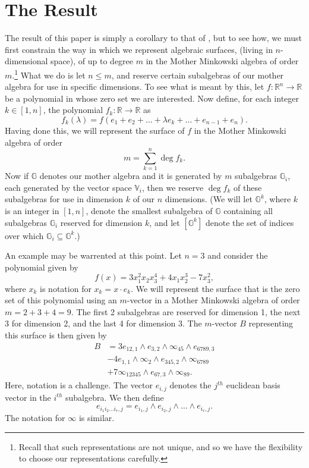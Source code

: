 \documentclass{birkjour}
\theoremstyle{definition}
\theoremstyle{remark}
\numberwithin{equation}{section}
\newcommand{\R}{\mathbb{R}}
\newcommand{\G}{\mathbb{G}}
\newcommand{\V}{\mathbb{V}}
\newcommand{\nvai}{\infty}
\begin{document}
\section{The Result}

The result of this paper is simply a corollary to that of \cite{Parkin13}, but to see how,
we must first constrain the way in which we represent algebraic surfaces, (living in $n$-dimensional space), of up to degree $m$
in the Mother Minkowski algebra of order $m$.\footnote{Recall that such representations are not unique, and so
we have the flexibility to choose our representations carefully.} What we do is let $n\leq m$, and
reserve certain subalgebras of our mother algebra for use in specific dimensions.
To see what is meant by this, let $f:\R^n\to\R$ be a polynomial in whose zero set
we are interested.  Now define, for each integer $k\in[1,n]$, the polynomial $f_k:\R\to\R$ as
\begin{equation*}
f_k(\lambda)=f(e_1+e_2+\dots+\lambda e_k+\dots +e_{n-1}+e_n).
\end{equation*}
Having done this, we will represent the
surface of $f$ in the Mother Minkowski algebra of order
\begin{equation*}
m=\sum_{k=1}^n\deg f_k.
\end{equation*}
Now if $\G$ denotes our mother algebra and it is generated by $m$ subalgebras $\G_i$,
each generated by the vector space $\V_i$, then we reserve $\deg f_k$
of these subalgebras for use in dimension $k$ of our $n$ dimensions.
(We will let $\G^k$, where $k$ is an integer in $[1,n]$, denote the smallest
subalgebra of $\G$ containing all subalgebras $\G_i$ reserved for dimension $k$,
and let $[\G^k]$ denote the set of indices over which $\G_i\subseteq\G^k$.)

An example may be warrented at this point.  Let $n=3$ and consider the
polynomial given by
\begin{equation}\label{equ_example_poly}
f(x) = 3x_1^2x_2x_3^4 + 4x_1x_2^3 - 7x_3^2,
\end{equation}
where $x_k$ is notation for $x_k=x\cdot e_k$.  We will represent the
surface that is the zero set of this polynomial using an $m$-vector
in a Mother Minkowski algebra of order $m=2+3+4=9$.  The first
2 subalgebras are reserved for dimension 1, the next 3 for dimension
2, and the last 4 for dimension 3.  The $m$-vector $B$
representing this surface is then given by
\begin{align}
B &= 3e_{12,1}\wedge e_{3,2}\wedge \nvai_{45} \wedge e_{6789,3}\nonumber \\
 &- 4e_{1,1}\wedge\nvai_2\wedge e_{345,2}\wedge\nvai_{6789}\nonumber \\
 &+7\nvai_{12345}\wedge e_{67,3}\wedge\nvai_{89}.\label{equ_B_example}
\end{align}
Here, notation is a challenge.  The vector $e_{i,j}$ denotes the $j^{th}$ euclidean basis vector
in the $i^{th}$ subalgebra.  We then define
\begin{equation*}
e_{i_1i_2\dots i_r,j} = e_{i_1,j}\wedge e_{i_2,j}\wedge\dots\wedge e_{i_r,j}.
\end{equation*}
The notation for $\nvai$ is similar.
\end{document}
